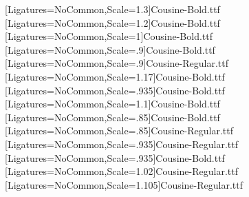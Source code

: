 \setmonofont[Ligatures=NoCommon,Scale=.9,SlantedFont={Cousine-Italic.ttf},BoldFont={Cousine-Bold.ttf},BoldSlantedFont={Cousine-BoldItalic.ttf}]{Cousine-Regular.ttf} %
\newfontface{\SecCode}[Ligatures=NoCommon,Scale=1.3]{Cousine-Bold.ttf}
\newfontface{\SubsecCode}[Ligatures=NoCommon,Scale=1.2]{Cousine-Bold.ttf}
\newfontface{\SubsubsecCode}[Ligatures=NoCommon,Scale=1]{Cousine-Bold.ttf}
\newfontface{\ParaCode}[Ligatures=NoCommon,Scale=.9]{Cousine-Bold.ttf}
\newfontface{\SubparaCode}[Ligatures=NoCommon,Scale=.9]{Cousine-Regular.ttf}
\newfontface{\RHCode}[Ligatures=NoCommon,Scale=1.17]{Cousine-Bold.ttf} %
\newfontface{\RHCodeEleven}[Ligatures=NoCommon,Scale=.935]{Cousine-Bold.ttf}
\newfontface{\RHCodeTwelve}[Ligatures=NoCommon,Scale=1.1]{Cousine-Bold.ttf}
\newfontface{\TOCCode}[Ligatures=NoCommon,Scale=.85]{Cousine-Bold.ttf}
\newfontface{\TOCCodeR}[Ligatures=NoCommon,Scale=.85]{Cousine-Regular.ttf}
\newfontface{\TOCCodeEleven}[Ligatures=NoCommon,Scale=.935]{Cousine-Regular.ttf}
\newfontface{\TOCCodeElevenB}[Ligatures=NoCommon,Scale=.935]{Cousine-Bold.ttf}
\newfontface{\TOCCodeTwelve}[Ligatures=NoCommon,Scale=1.02]{Cousine-Regular.ttf}
\newfontface{\TOCCodeThirteen}[Ligatures=NoCommon,Scale=1.105]{Cousine-Regular.ttf}

